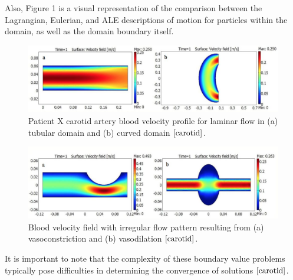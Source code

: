 \documentclass[12pt, a4paper]{article}
\theoremstyle{plain}
\theoremstyle{definition}
\theoremstyle{remark}
\begin{document}
\noindent Also, Figure 1 is a visual representation of the comparison between the Lagrangian, Eulerian, and ALE descriptions of motion for particles within the domain, as well as the domain boundary itself.  


\newpage

\begin{figure}[ht!]
\centering
\includegraphics[width=150mm]{carotidartery.jpg}
\caption{Patient X carotid artery blood velocity profile for laminar flow in (a) tubular domain and (b) curved domain $\cite{carotid}$.}
\end{figure}
\begin{figure}[ht!]
\centering
\includegraphics[width=150mm]{vasoconstriction.jpg}
\caption{Blood velocity field with irregular flow pattern resulting from (a) vasoconstriction and (b) vasodilation $\cite{carotid}$.}
\end{figure}


It is important to note that the complexity of these boundary value problems typically pose difficulties in determining the convergence of solutions $\cite{carotid}$.
\end{document}
